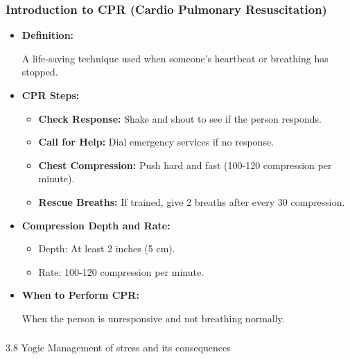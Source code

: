 \begin{frame}[fragile]\frametitle{Introduction to CPR (Cardio Pulmonary Resuscitation)}

      \begin{itemize}
        \item \textbf{Definition:} 
        
        A life-saving technique used when someone’s heartbeat or breathing has stopped.
        
        \item \textbf{CPR Steps:} 
        \begin{itemize}
            \item \textbf{Check Response:} Shake and shout to see if the person responds.
            \item \textbf{Call for Help:} Dial emergency services if no response.
            \item \textbf{Chest Compression:} Push hard and fast (100-120 compression per minute).
            \item \textbf{Rescue Breaths:} If trained, give 2 breaths after every 30 compression.
        \end{itemize}
        \item \textbf{Compression Depth and Rate:} 
        \begin{itemize}
            \item Depth: At least 2 inches (5 cm).
            \item Rate: 100-120 compression per minute.
        \end{itemize}
        \item \textbf{When to Perform CPR:} 
        
        When the person is unresponsive and not breathing normally.
        
      \end{itemize}

\end{frame}

\begin{frame}[fragile]\frametitle{}
\begin{center}
{\Large 3.8 Yogic Management of stress and its consequences}
\end{center}
\end{frame}

